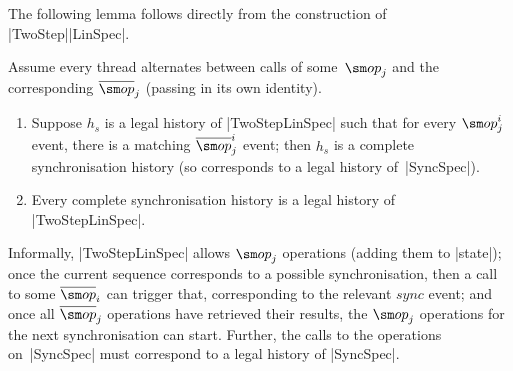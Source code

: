 

The following lemma follows directly from the construction of
|TwoStep|\-|LinSpec|.  
%
\begin{lemma}
\label{lem:TwoStepLinSpec}
Assume every thread alternates between calls of some~$\op_j$ and the
corresponding $\overline\op_j$ (passing in its own identity).
%
\begin{enumerate}
\item Suppose $h_s$ is a legal history of |TwoStepLinSpec| such that for
  every $\op_j^i$ event, there is a matching $\overline{\op}_j^i$ event; then
  $h_s$ is a complete synchronisation history (so corresponds to a legal
  history of~|SyncSpec|).

\item Every complete synchronisation history is a legal history of
  |TwoStepLinSpec|.
\end{enumerate}
\end{lemma}
%
Informally, |TwoStepLinSpec| allows $\op_j$ operations (adding them to
|state|); once the current sequence corresponds to a possible synchronisation,
then a call to some $\overline\op_i$ can trigger that, corresponding to the
relevant $sync$ event; and once all $\overline\op_j$
operations have retrieved their results, the $\op_j$ operations for the next
synchronisation can start.  Further, the calls to the operations on~|SyncSpec|
must correspond to a legal history of |SyncSpec|.



